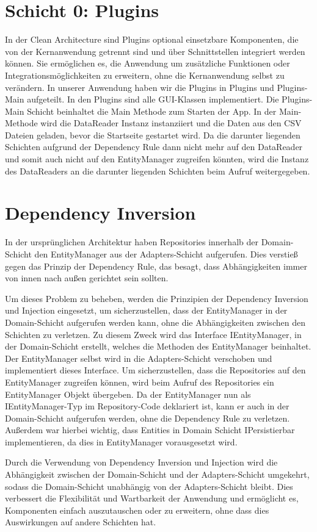 \section{Schicht 0: Plugins}
In der Clean Architecture sind Plugins optional einsetzbare Komponenten, die von der Kernanwendung getrennt sind und über Schnittstellen integriert werden können. Sie ermöglichen es, die Anwendung um zusätzliche Funktionen oder Integrationsmöglichkeiten zu erweitern, ohne die Kernanwendung selbst zu verändern. In unserer Anwendung haben wir die Plugins in Plugins und Plugins-Main aufgeteilt.
In den Plugins sind alle GUI-Klassen implementiert.
Die Plugins-Main Schicht beinhaltet die Main Methode zum Starten der App. In der Main-Methode wird die DataReader Instanz instanziiert und die Daten aus den CSV Dateien geladen, bevor die Startseite gestartet wird. Da die darunter liegenden Schichten aufgrund der Dependency Rule dann nicht mehr auf den DataReader und somit auch nicht auf den EntityManager zugreifen könnten, wird die Instanz des DataReaders an die darunter liegenden Schichten beim Aufruf weitergegeben.


\section{Dependency Inversion}
\label{DI}
In der ursprünglichen Architektur haben Repositories innerhalb der Domain-Schicht den EntityManager aus der Adapters-Schicht aufgerufen. Dies verstieß gegen das Prinzip der Dependency Rule, das besagt, dass Abhängigkeiten immer von innen nach außen gerichtet sein sollten.

Um dieses Problem zu beheben, werden die Prinzipien der Dependency Inversion und Injection eingesetzt, um sicherzustellen, dass der EntityManager in der Domain-Schicht aufgerufen werden kann, ohne die Abhängigkeiten zwischen den Schichten zu verletzen.
Zu diesem Zweck wird das Interface IEntityManager, in der Domain-Schicht erstellt, welches die Methoden des EntityManager beinhaltet. Der EntityManager selbst wird in die Adapters-Schicht verschoben und implementiert dieses Interface. Um sicherzustellen, dass die Repositories auf den EntityManager zugreifen können, wird beim Aufruf des Repositories ein EntityManager Objekt übergeben. Da der EntityManager nun als IEntityManager-Typ im Repository-Code deklariert ist, kann er auch in der Domain-Schicht aufgerufen werden, ohne die Dependency Rule zu verletzen. Außerdem war hierbei wichtig, dass Entities in Domain Schicht IPersistierbar implementieren, da dies in EntityManager vorausgesetzt wird. 

Durch die Verwendung von Dependency Inversion und Injection wird die Abhängigkeit zwischen der Domain-Schicht und der Adapters-Schicht umgekehrt, sodass die Domain-Schicht unabhängig von der Adapters-Schicht bleibt. Dies verbessert die Flexibilität und Wartbarkeit der Anwendung und ermöglicht es, Komponenten einfach auszutauschen oder zu erweitern, ohne dass dies Auswirkungen auf andere Schichten hat.


